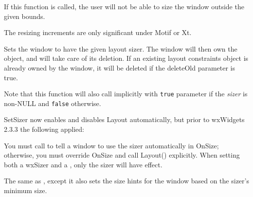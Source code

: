 


If this function is called, the user will not be able to size the window outside the
given bounds.

The resizing increments are only significant under Motif or Xt.


\label{wxwindowsetsizer}


Sets the window to have the given layout sizer. The window
will then own the object, and will take care of its deletion.
If an existing layout constraints object is already owned by the
window, it will be deleted if the deleteOld parameter is true.

Note that this function will also call
 implicitly with {\tt true}
parameter if the {\it sizer}\/ is non-NULL and {\tt false} otherwise.





SetSizer now enables and disables Layout automatically, but prior to wxWidgets 2.3.3
the following applied:

You must call  to tell a window to use
the sizer automatically in OnSize; otherwise, you must override OnSize and call Layout()
explicitly. When setting both a wxSizer and a ,
only the sizer will have effect.


\label{wxwindowsetsizerandfit}


The same as , except it also sets the size hints
for the window based on the sizer's minimum size.


